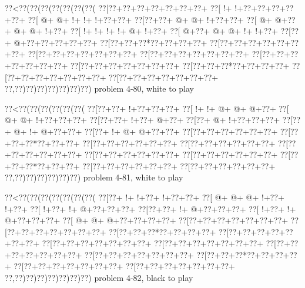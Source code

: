 \vbox{\vbox{\goo
\0??<\0??(\0??(\0??(\0??(\0??(\0??(\0??(
\0??[\0??+\0??+\0??+\0??+\0??+\0??+\0??+
\0??[\- !+\- !+\0??+\0??+\0??+\0??+\0??+
\0??[\- @+\- @+\- !+\- !+\- !+\0??+\0??+
\0??[\0??+\0??+\- @+\- @+\- !+\0??+\0??+
\0??[\- @+\- @+\0??+\- @+\- @+\- !+\0??+
\0??[\- !+\- !+\- !+\- !+\- @+\- !+\0??+
\0??[\- @+\0??+\- @+\- @+\- !+\- !+\0??+
\0??[\0??+\- @+\0??+\0??+\0??+\0??+\0??+
\0??[\0??+\0??+\0??*\0??+\0??+\0??+\0??+
\0??[\0??+\0??+\0??+\0??+\0??+\0??+\0??+
\0??[\0??+\0??+\0??+\0??+\0??+\0??+\0??+
\0??[\0??+\0??+\0??+\0??+\0??+\0??+\0??+
\0??[\0??+\0??+\0??+\0??+\0??+\0??+\0??+
\0??[\0??+\0??+\0??+\0??+\0??+\0??+\0??+
\0??[\0??+\0??+\0??*\0??+\0??+\0??+\0??+
\0??[\0??+\0??+\0??+\0??+\0??+\0??+\0??+
\0??[\0??+\0??+\0??+\0??+\0??+\0??+\0??+
\0??,\0??)\0??)\0??)\0??)\0??)\0??)\0??)
}
\hfil problem 4-80, white to play\hfil\break
}

\vbox{\vbox{\goo
\0??<\0??(\0??(\0??(\0??(\0??(\0??(
\0??[\0??+\0??+\- !+\0??+\0??+\0??+
\0??[\- !+\- !+\- @+\- @+\- @+\0??+
\0??[\- @+\- @+\- !+\0??+\0??+\0??+
\0??[\0??+\0??+\- !+\0??+\- @+\0??+
\0??[\0??+\- @+\- !+\0??+\0??+\0??+
\0??[\0??+\- @+\- !+\- @+\0??+\0??+
\0??[\0??+\- !+\- @+\- @+\0??+\0??+
\0??[\0??+\0??+\0??+\0??+\0??+\0??+
\0??[\0??+\0??+\0??*\0??+\0??+\0??+
\0??[\0??+\0??+\0??+\0??+\0??+\0??+
\0??[\0??+\0??+\0??+\0??+\0??+\0??+
\0??[\0??+\0??+\0??+\0??+\0??+\0??+
\0??[\0??+\0??+\0??+\0??+\0??+\0??+
\0??[\0??+\0??+\0??+\0??+\0??+\0??+
\0??[\0??+\0??+\0??*\0??+\0??+\0??+
\0??[\0??+\0??+\0??+\0??+\0??+\0??+
\0??[\0??+\0??+\0??+\0??+\0??+\0??+
\0??,\0??)\0??)\0??)\0??)\0??)\0??)
}
\hfil problem 4-81, white to play\hfil\break
}

\vbox{\vbox{\goo
\0??<\0??(\0??(\0??(\0??(\0??(\0??(\0??(
\0??[\0??+\- !+\- !+\0??+\- !+\0??+\0??+
\0??[\- @+\- @+\- @+\- !+\0??+\- !+\0??+
\0??[\- !+\0??+\- !+\- @+\0??+\0??+\0??+
\0??[\0??+\0??+\- !+\- @+\0??+\0??+\0??+
\0??[\- !+\0??+\- !+\- @+\0??+\0??+\0??+
\0??[\- @+\- @+\- @+\0??+\0??+\0??+\0??+
\0??[\0??+\0??+\0??+\0??+\0??+\0??+\0??+
\0??[\0??+\0??+\0??+\0??+\0??+\0??+\0??+
\0??[\0??+\0??+\0??*\0??+\0??+\0??+\0??+
\0??[\0??+\0??+\0??+\0??+\0??+\0??+\0??+
\0??[\0??+\0??+\0??+\0??+\0??+\0??+\0??+
\0??[\0??+\0??+\0??+\0??+\0??+\0??+\0??+
\0??[\0??+\0??+\0??+\0??+\0??+\0??+\0??+
\0??[\0??+\0??+\0??+\0??+\0??+\0??+\0??+
\0??[\0??+\0??+\0??*\0??+\0??+\0??+\0??+
\0??[\0??+\0??+\0??+\0??+\0??+\0??+\0??+
\0??[\0??+\0??+\0??+\0??+\0??+\0??+\0??+
\0??,\0??)\0??)\0??)\0??)\0??)\0??)\0??)
}
\hfil problem 4-82, black to play\hfil\break
}

